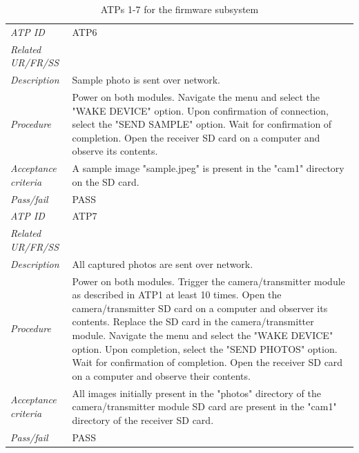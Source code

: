 \documentclass[class=report,11pt,crop=false]{standalone}
\begin{document}
\begin{table}[!ht]
\begin{scriptsize}
\begin{tabularx}{\textwidth}{|p{} X|}
        \textit{ATP ID} & ATP6\\
        \textit{Related UR/FR/SS} & \\
        \textit{Description} & Sample photo is sent over network.\\
        \textit{Procedure} & Power on both modules. Navigate the menu and select the "WAKE DEVICE" option. Upon confirmation of connection, select the "SEND SAMPLE" option. Wait for confirmation of completion. Open the receiver SD card on a computer and observe its contents.\\
        \textit{Acceptance criteria} & A sample image "sample.jpeg" is present in the "cam1" directory on the SD card. \\ 
        \textit{Pass/fail} & PASS \\ \hline

        \textit{ATP ID} & ATP7 \\
        \textit{Related UR/FR/SS} & \\
        \textit{Description} & All captured photos are sent over network.\\
        \textit{Procedure} & Power on both modules. Trigger the camera/transmitter module as described in ATP1 at least 10 times. Open the camera/transmitter SD card on a computer and observer its contents. Replace the SD card in the camera/transmitter module. Navigate the menu and select the "WAKE DEVICE" option. Upon completion, select the "SEND PHOTOS" option. Wait for confirmation of completion. Open the receiver SD card on a computer and observe their contents.\\
        \textit{Acceptance criteria} & All images initially present in the "photos" directory of the camera/transmitter module SD card are present in the "cam1" directory of the receiver SD card.\\ 
        \textit{Pass/fail} & PASS \\ \hline
        

    \end{tabularx}
    \end{scriptsize}
    \caption{ATPs 1-7 for the firmware subsystem}
    \label{tab:firmware-atps1}
\end{table}
\end{document}
